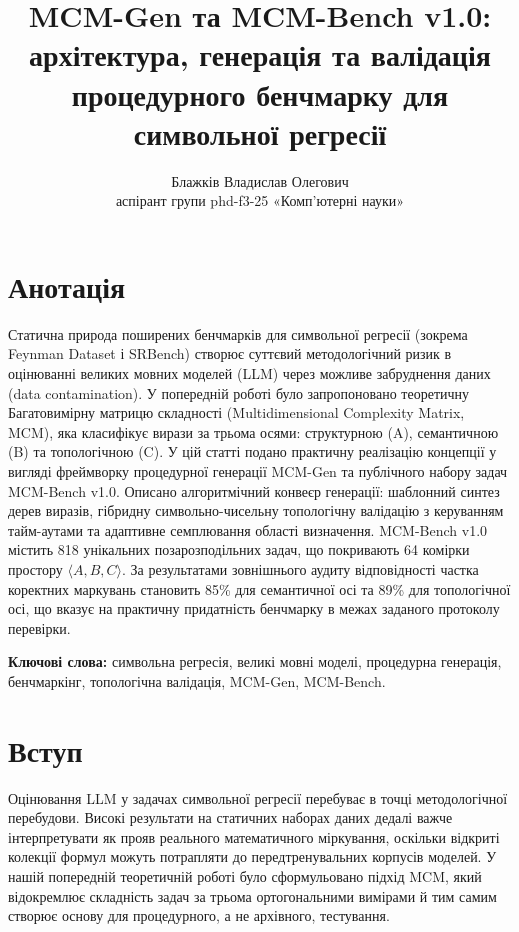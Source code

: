 \documentclass[11pt]{article}
\title{MCM-Gen та MCM-Bench v1.0: архітектура, генерація та валідація процедурного бенчмарку для символьної регресії}
\author{Блажків Владислав Олегович\\аспірант групи phd-f3-25 «Комп'ютерні науки»}
\date{}
\begin{document}

\maketitle

\section*{Анотація}

Статична природа поширених бенчмарків для символьної регресії (зокрема Feynman Dataset і SRBench) створює суттєвий методологічний ризик в оцінюванні великих мовних моделей (LLM) через можливе забруднення даних (data contamination). У попередній роботі було запропоновано теоретичну Багатовимірну матрицю складності (Multidimensional Complexity Matrix, MCM), яка класифікує вирази за трьома осями: структурною (A), семантичною (B) та топологічною (C). У цій статті подано практичну реалізацію концепції у вигляді фреймворку процедурної генерації MCM-Gen та публічного набору задач MCM-Bench v1.0. Описано алгоритмічний конвеєр генерації: шаблонний синтез дерев виразів, гібридну символьно-чисельну топологічну валідацію з керуванням тайм-аутами та адаптивне семплювання області визначення. MCM-Bench v1.0 містить 818 унікальних позарозподільних задач, що покривають 64 комірки простору $\langle A,B,C\rangle$. За результатами зовнішнього аудиту відповідності частка коректних маркувань становить 85\% для семантичної осі та 89\% для топологічної осі, що вказує на практичну придатність бенчмарку в межах заданого протоколу перевірки.

\textbf{Ключові слова:} символьна регресія, великі мовні моделі, процедурна генерація, бенчмаркінг, топологічна валідація, MCM-Gen, MCM-Bench.

\section{Вступ}

Оцінювання LLM у задачах символьної регресії перебуває в точці методологічної перебудови. Високі результати на статичних наборах даних дедалі важче інтерпретувати як прояв реального математичного міркування, оскільки відкриті колекції формул можуть потрапляти до передтренувальних корпусів моделей. У нашій попередній теоретичній роботі було сформульовано підхід MCM, який відокремлює складність задач за трьома ортогональними вимірами й тим самим створює основу для процедурного, а не архівного, тестування.
\end{document}
